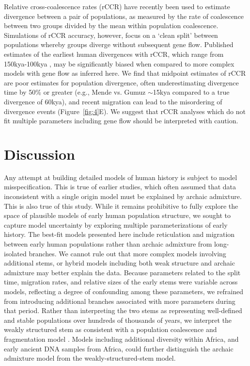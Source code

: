 \documentclass[]{article}
\begin{document}
Relative cross-coalescence rates (rCCR) have recently been used to estimate
divergence between a pair of populations, as measured by the rate of
coalescence between two groups divided by the mean within population
coalescence. Simulations of rCCR accuracy, however, focus on a ‘clean split’
between populations whereby groups diverge without subsequent gene flow.
Published estimates of the earliest human divergences with rCCR, which range
from 150kya-100kya \citep{Bergstrom2021-iw}, may be significantly biased when
compared to more complex models with gene flow as inferred here. We find that
midpoint estimates of rCCR are poor estimates for population divergence, often
underestimating divergence time by 50\% or greater (e.g., Mende vs. Gumuz
$\sim$15kya compared to a true divergence of 60kya), and recent migration can
lead to the misordering of divergence events (Figure~\ref{fig:4}E). We suggest
that rCCR analyses which do not fit multiple parameters including gene flow
should be interpreted with caution.

\section*{Discussion}

Any attempt at building detailed models of human history is subject to model
misspecification. This is true of earlier studies, which often assumed that
data inconsistent with a single origin model must be explained by archaic
admixture. This is also true of this study. While it remains prohibitive to
fully explore the space of plausible models of early human population structure,
we sought to capture model uncertainty by exploring multiple parameterizations of
early history.
The best-fit models presented here include reticulation and migration between
early human populations rather than archaic admixture from long-isolated branches.
We cannot rule out that more complex models involving
additional stems, or hybrid models including both weak structure and archaic
admixture may better explain the data. Because parameters related to the split
time, migration rates, and relative sizes of the early stems were variable
across models, reflecting a degree of confounding among these parameters, we
refrained from introducing additional branches associated with more
parameters during that period.
Rather than interpreting the two stems as representing well-defined
and stable populations over hundreds of thousands of years, we interpret the
weakly structured stem as consistent with a population coalescence and
fragmentation model \citep{Scerri2019-xg}.
Models including additional diversity within Africa,
and early ancient DNA samples from Africa, could further distinguish
the archaic admixture model from the weakly-structured-stem model.
\end{document}

